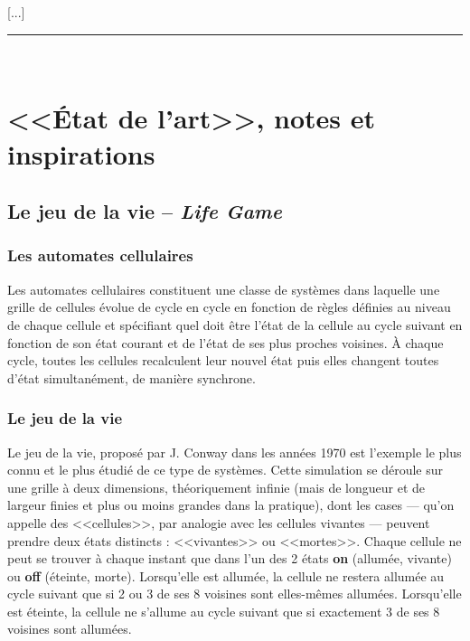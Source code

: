 \documentclass[11pt,twoside,a4paper]{article}
\begin{document}
[...]~\\

\rule{10cm}{0.5mm}~\\


\clearpage


\section{<<{\'E}tat de l'art>>, notes et inspirations}

\subsection{Le jeu de la vie -- \textit{Life Game}}

\subsubsection{Les automates cellulaires}

Les automates cellulaires constituent une classe de syst{\`e}mes dans laquelle une grille de cellules {\'e}volue de cycle en cycle en fonction de r{\`e}gles d{\'e}finies au niveau de chaque cellule et sp{\'e}cifiant quel doit {\^e}tre l'{\'e}tat de la cellule au cycle suivant en fonction de son {\'e}tat courant et de l'{\'e}tat de ses plus proches voisines. {\`A} chaque cycle, toutes les cellules recalculent leur nouvel {\'e}tat puis elles changent toutes d'{\'e}tat simultan{\'e}ment, de mani{\`e}re synchrone.~\\

\subsubsection{Le jeu de la vie}

Le jeu de la vie, propos{\'e} par J. Conway dans les ann{\'e}es 1970 est l'exemple le plus connu et le plus {\'e}tudi{\'e} de ce type de syst{\`e}mes. Cette simulation se d{\'e}roule sur une grille {\`a} deux dimensions, th{\'e}oriquement infinie (mais de longueur et de largeur finies et plus ou moins grandes dans la pratique), dont les cases --- qu'on appelle des <<cellules>>, par analogie avec les cellules vivantes --- peuvent prendre deux {\'e}tats distincts : <<vivantes>> ou <<mortes>>. Chaque cellule ne peut se trouver {\`a} chaque instant que dans l'un des 2 {\'e}tats \textbf{on} (allum{\'e}e, vivante) ou \textbf{off} ({\'e}teinte, morte). Lorsqu'elle est allum{\'e}e, la cellule ne restera allum{\'e}e au cycle suivant que si 2 ou 3 de ses 8 voisines sont elles-m{\^e}mes allum{\'e}es. Lorsqu'elle est {\'e}teinte, la cellule ne s'allume au cycle suivant que si exactement 3 de ses 8 voisines sont allum{\'e}es.~\\
\end{document}

